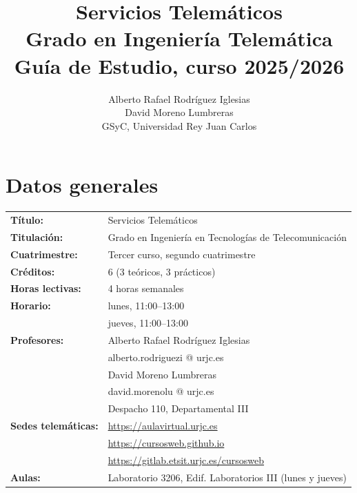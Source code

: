\documentclass[a4paper,12pt]{article}
\title{Servicios Telemáticos \\
Grado en Ingeniería Telemática \\
Guía de Estudio, curso 2025/2026}
\author{Alberto Rafael Rodríguez Iglesias \\
  David Moreno Lumbreras \\
GSyC, Universidad Rey Juan Carlos}
\begin{document}
\maketitle

\tableofcontents

\newpage

\section{Datos generales}

\begin{tabular}{ll}
\textbf{Título:} & Servicios Telemáticos \\
\textbf{Titulación:} & Grado en Ingeniería en Tecnologías de Telecomunicación \\
\textbf{Cuatrimestre:} & Tercer curso, segundo cuatrimestre \\
\textbf{Créditos:} & 6 (3 teóricos, 3 prácticos) \\
\textbf{Horas lectivas:} & 4 horas semanales \\
\textbf{Horario:} & lunes, 11:00--13:00 \\
                  & jueves, 11:00--13:00 \\
\textbf{Profesores:}
& Alberto Rafael Rodríguez Iglesias \\
& \hspace{1cm}alberto.rodriguezi @ urjc.es \\
& David Moreno Lumbreras \\
& \hspace{1cm}david.morenolu @ urjc.es \\
& \hspace{1cm}Despacho 110, Departamental III\\
\textbf{Sedes telemáticas:} & \url{https://aulavirtual.urjc.es} \\
                            & \url{https://cursosweb.github.io} \\
                            & \url{https://gitlab.etsit.urjc.es/cursosweb} \\
\textbf{Aulas:} & Laboratorio 3206, Edif. Laboratorios III (lunes y jueves) \\
\end{tabular}

\newpage
\end{document}
